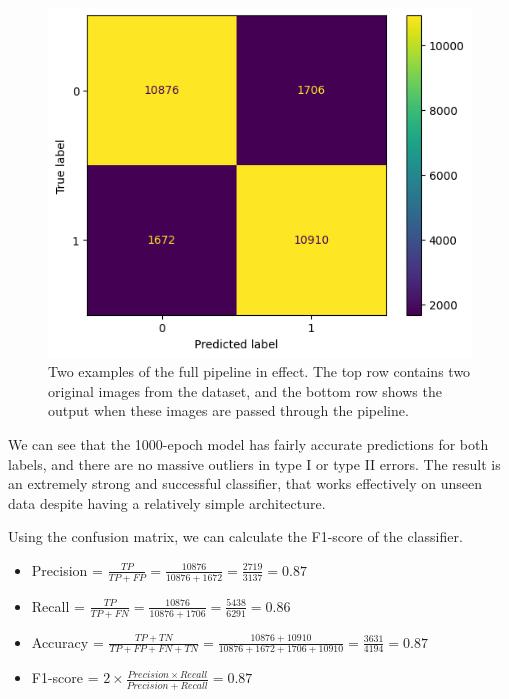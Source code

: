 \documentclass[a4paper, oneside, 11pt]{article}
\begin{document}
\bigskip
\begin{figure}[ht]
    \centering
    \includegraphics[scale = 0.8]{img/confusion_matrix.png}
    \caption{Two examples of the full pipeline in effect. The top row contains two original images from the dataset, and the bottom row shows the output when these images are passed through the pipeline.}
    \label{fig:confusion-matrix}
\end{figure}

\bigskip
\noindent
We can see that the 1000-epoch model has fairly accurate predictions for both labels, and there are no massive outliers in type I or type II errors. The result is an extremely strong and successful classifier, that works effectively on unseen data despite having a relatively simple architecture.

\bigskip
\noindent
Using the confusion matrix, we can calculate the F1-score of the classifier. 
\begin{itemize}
    \item Precision = $\frac{TP}{TP + FP} = \frac{10876}{10876+1672} = \frac{2719}{3137} = 0.87$
    \item Recall = $\frac{TP}{TP + FN} = \frac{10876}{10876+1706} = \frac{5438}{6291} = 0.86$
    \item Accuracy = $\frac{TP + TN}{TP + FP + FN + TN} = \frac{10876 + 10910}{10876 + 1672 + 1706 + 10910} = \frac{3631}{4194} = 0.87$
    \item F1-score = $2 \times \frac{Precision \times Recall}{Precision + Recall} = 0.87$
\end{itemize}
\end{document}
